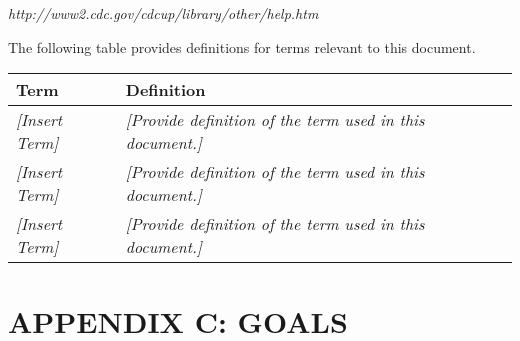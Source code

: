 \documentclass[a4paper, 11pt]{article}
\begin{document}
\emph{http://www2.cdc.gov/cdcup/library/other/help.htm}

The following table provides definitions for terms relevant to this
document.

\begin{longtable}[]{@{}ll@{}}
\toprule
\textbf{Term} & \textbf{Definition}\tabularnewline
\midrule
\endhead
\emph{{[}Insert Term{]}} & \emph{{[}Provide definition of the term used
in this document.{]}}\tabularnewline
\emph{{[}Insert Term{]}} & \emph{{[}Provide definition of the term used
in this document.{]}}\tabularnewline
\emph{{[}Insert Term{]}} & \emph{{[}Provide definition of the term used
in this document.{]}}\tabularnewline
\bottomrule
\end{longtable}

\newpage


\section{APPENDIX C: GOALS}
\end{document}

